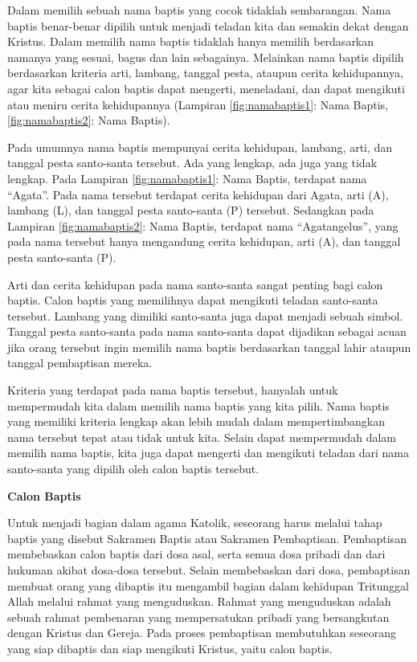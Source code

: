 \documentclass[a4paper,twoside]{article}
\begin{document}
\begin{enumerate}
	
	Dalam memilih sebuah nama baptis yang cocok tidaklah sembarangan. Nama baptis benar-benar dipilih untuk menjadi teladan kita dan semakin dekat dengan Kristus. Dalam memilih nama baptis tidaklah hanya memilih berdasarkan namanya yang sesuai, bagus dan lain sebagainya. Melainkan nama baptis dipilih berdasarkan kriteria arti, lambang, tanggal pesta, ataupun cerita kehidupannya, agar kita sebagai calon baptis dapat mengerti, meneladani, dan dapat mengikuti atau meniru cerita kehidupannya (Lampiran \ref{fig:namabaptis1}: Nama Baptis, \ref{fig:namabaptis2}: Nama Baptis).
	
	Pada umumnya nama baptis mempunyai cerita kehidupan, lambang, arti, dan tanggal pesta santo-santa tersebut. Ada yang lengkap, ada juga yang tidak lengkap. Pada Lampiran \ref{fig:namabaptis1}: Nama Baptis, terdapat nama ``Agata''. Pada nama tersebut terdapat cerita kehidupan dari Agata, arti (A), lambang (L), dan tanggal pesta santo-santa (P) tersebut. Sedangkan pada Lampiran \ref{fig:namabaptis2}: Nama Baptis, terdapat nama ``Agatangelus'', yang pada nama tersebut hanya mengandung cerita kehidupan, arti (A), dan tanggal pesta santo-santa (P).
	
	Arti dan cerita kehidupan pada nama santo-santa sangat penting bagi calon baptis. Calon baptis yang memilihnya dapat mengikuti teladan santo-santa tersebut. Lambang yang dimiliki santo-santa juga dapat menjadi sebuah simbol. Tanggal pesta santo-santa pada nama santo-santa dapat dijadikan sebagai acuan jika orang tersebut ingin memilih nama baptis berdasarkan tanggal lahir ataupun tanggal pembaptisan mereka.
	
	Kriteria yang terdapat pada nama baptis tersebut, hanyalah untuk mempermudah kita dalam memilih nama baptis yang kita pilih. Nama baptis yang memiliki kriteria lengkap akan lebih mudah dalam mempertimbangkan nama tersebut tepat atau tidak untuk kita. Selain dapat mempermudah dalam memilih nama baptis, kita juga dapat mengerti dan mengikuti teladan dari nama santo-santa yang dipilih oleh calon baptis tersebut.
	
\textbf{Calon Baptis}
	
	Untuk menjadi bagian dalam agama Katolik, seseorang harus melalui tahap baptis yang disebut Sakramen Baptis atau Sakramen Pembaptisan. Pembaptisan membebaskan calon baptis dari dosa asal, serta semua dosa pribadi dan dari hukuman akibat dosa-dosa tersebut. Selain membebaskan dari dosa, pembaptisan membuat orang yang dibaptis itu mengambil bagian dalam kehidupan Tritunggal Allah melalui rahmat yang menguduskan. Rahmat yang menguduskan adalah sebuah rahmat pembenaran yang mempersatukan pribadi yang bersangkutan dengan Kristus dan Gereja. Pada proses pembaptisan membutuhkan seseorang yang siap dibaptis dan siap mengikuti Kristus, yaitu calon baptis.
	

\end{enumerate}
\end{document}
